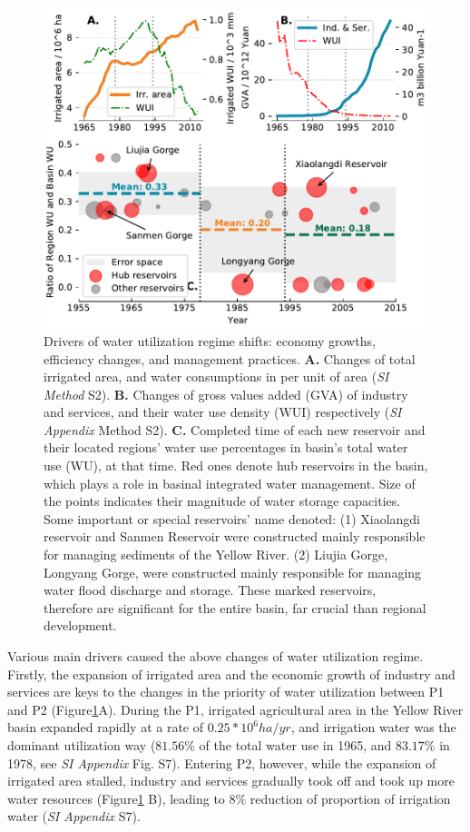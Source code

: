 \documentclass[9pt, twocolumn, twoside, lineno]{pnas-new}
\begin{document}
\begin{figure}[th!]
	\centering
	\includegraphics[width=\linewidth]{../../figures/main/causes.pdf}
	\caption{
		Drivers of water utilization regime shifts: economy growths, efficiency changes, and management practices.
		\textbf{A.} Changes of total irrigated area, and water consumptions in per unit of area (\textit{SI Method} S2).
		\textbf{B.} Changes of gross values added (GVA) of industry and services, and their water use density (WUI) respectively (\textit{SI Appendix} Method S2).
		\textbf{C.} Completed time of each new reservoir and their located regions' water use percentages in basin's total water use (WU), at that time. Red ones denote hub reservoirs in the basin, which plays a role in basinal integrated water management. Size of the points indicates their magnitude of water storage capacities. Some important or special reservoirs' name denoted: (1) Xiaolangdi reservoir and Sanmen Reservoir were constructed mainly responsible for managing sediments of the Yellow River. (2) Liujia Gorge, Longyang Gorge, were constructed mainly responsible for managing water flood discharge and storage. These marked reservoirs, therefore are significant for the entire basin, far crucial than regional development.
	}
	\label{fig:Causes}
\end{figure}

Various main drivers caused the above changes of water utilization regime.
Firstly, the expansion of irrigated area and the economic growth of industry and services are keys to the changes in the priority of water utilization between P1 and P2 (Figure\ref{fig:Causes}A). During the P1, irrigated agricultural area in the Yellow River basin expanded rapidly at a rate of $0.25*10^6 ha/yr$, and irrigation water was the dominant utilization way ($81.56\%$ of the total water use in 1965, and $83.17\%$ in 1978, see \textit{SI Appendix} Fig. S7). Entering P2, however, while the expansion of irrigated area stalled, industry and services gradually took off and took up more water resources (Figure\ref{fig:Causes} B), leading to $8\%$ reduction of proportion of irrigation water (\textit{SI Appendix} S7).
\end{document}

